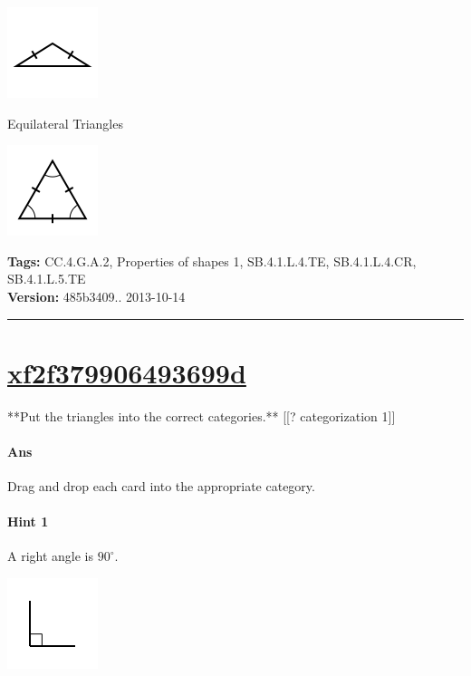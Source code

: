 \documentclass[twocolumn,10pt]{article}
\def\shrinkfactor{0.55}
\begin{document}
\includegraphics[scale=\shrinkfactor]{figures/ab33a8ea9f6040b7277f725f46c6d9452ab8fbbc.png}

Equilateral Triangles


\includegraphics[scale=\shrinkfactor]{figures/2e6355867a1027528f1719f9dcb578dcb221b055.png}



\medskip
\noindent
\textbf{Tags:} {\footnotesize CC.4.G.A.2, Properties of shapes 1, SB.4.1.L.4.TE, SB.4.1.L.4.CR, SB.4.1.L.5.TE}\\
\textbf{Version:} 485b3409.. 2013-10-14
\smallskip\hrule





\section{\href{https://www.khanacademy.org/devadmin/content/items/xf2f379906493699d}{xf2f379906493699d}}

\noindent
**Put the triangles into the correct categories.**
[[? categorization 1]]


\paragraph{Ans} Drag and drop each card into the appropriate category. 

\paragraph{Hint 1}A right angle is $90 ^\circ$.

\includegraphics[scale=\shrinkfactor]{figures/e6ad77b54552295693aae7e39624ed456b552099.png}
\end{document}
